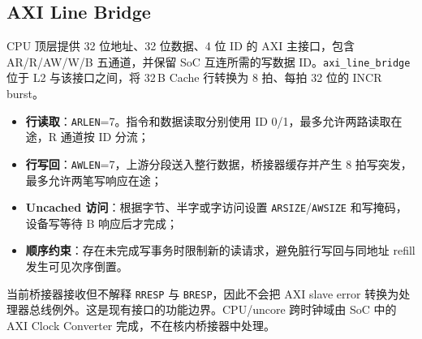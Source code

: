 \subsection{AXI Line Bridge}

CPU 顶层提供 32 位地址、32 位数据、4 位 ID 的 AXI 主接口，包含 AR/R/AW/W/B 五通道，并保留 SoC 互连所需的写数据 ID。\texttt{axi\_line\_bridge} 位于 L2 与该接口之间，将 32\,B Cache 行转换为 8 拍、每拍 32 位的 INCR burst。

\begin{itemize}
  \item \textbf{行读取}：\texttt{ARLEN}=7。指令和数据读取分别使用 ID 0/1，最多允许两路读取在途，R 通道按 ID 分流；
  \item \textbf{行写回}：\texttt{AWLEN}=7，上游分段送入整行数据，桥接器缓存并产生 8 拍写突发，最多允许两笔写响应在途；
  \item \textbf{Uncached 访问}：根据字节、半字或字访问设置 \texttt{ARSIZE}/\texttt{AWSIZE} 和写掩码，设备写等待 B 响应后才完成；
  \item \textbf{顺序约束}：存在未完成写事务时限制新的读请求，避免脏行写回与同地址 refill 发生可见次序倒置。
\end{itemize}

当前桥接器接收但不解释 \texttt{RRESP} 与 \texttt{BRESP}，因此不会把 AXI slave error 转换为处理器总线例外。这是现有接口的功能边界。CPU/uncore 跨时钟域由 SoC 中的 AXI Clock Converter 完成，不在核内桥接器中处理。
